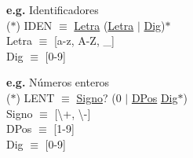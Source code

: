 \documentclass[\main/Apuntes_PL.tex]{subfiles}
\begin{document}
      \bigskip
      \par
      \textbf{e.g.} Identificadores\\
      \hspace{5mm}($\ast$) IDEN $\equiv$ \underline{Letra} (\underline{Letra} $\mid$ \underline{Dig})$\ast$ \\
      \hspace{10mm} Letra $\equiv$ [a-z, A-Z, \_] \\
      \hspace{10mm} Dig $\equiv$ [0-9]

      \bigskip
      \par
      \textbf{e.g.} Números enteros\\
      \hspace{5mm}($\ast$) LENT $\equiv$ \underline{Signo}? (0 $\mid$ \underline{DPos} \underline{Dig}$\ast$) \\
      \hspace{10mm} Signo $\equiv$ [\textbackslash+, \textbackslash-] \\
      \hspace{10mm} DPos  $\equiv$ [1-9] \\
      \hspace{10mm} Dig   $\equiv$ [0-9]
\end{document}

